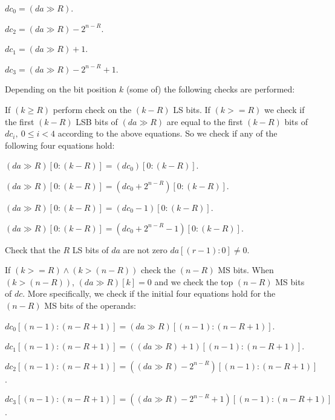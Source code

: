 \begin{DoxyItemize}
\item $dc_0 = (da \gg R)$.
\item $dc_2 = (da \gg R) - 2^{n-R}$.
\item $dc_1 = (da \gg R) + 1$.
\item $dc_3 = (da \gg R) - 2^{n-R} + 1$.
\end{DoxyItemize}

\-Depending on the bit position $k$ (some of) the following checks are performed\-:


\begin{DoxyEnumerate}
\item \-If $(k \ge R)$ perform check on the $(k-R)$ \-L\-S bits. \-If $(k >= R)$ we check if the first $(k-R)$ \-L\-S\-B bits of $(da \gg R)$ are equal to the first $(k-R)$ bits of $dc_i,~ 0 \le i < 4$ according to the above equations. \-So we check if any of the following four equations hold\-:
\begin{DoxyItemize}
\item $(da \gg R)[0:(k - R)] = (dc_0)[0:(k - R)]$.
\item $(da \gg R)[0:(k - R)] = (dc_0 + 2^{n-R})[0:(k - R)]$.
\item $(da \gg R)[0:(k - R)] = (dc_0 - 1)[0:(k - R)]$.
\item $(da \gg R)[0:(k - R)] = (dc_0 + 2^{n-R} - 1)[0:(k - R)]$.
\end{DoxyItemize}
\item \-Check that the $R$ \-L\-S bits of $da$ are not zero $da[(r-1):0] \neq 0$.
\item \-If $(k >= R) \wedge (k > (n - R))$ check the $(n-R)$ \-M\-S bits. \-When $(k > (n - R))$, $(da \gg R)[k] = 0$ and we check the top $(n-R)$ \-M\-S bits of $dc$. \-More specifically, we check if the initial four equations hold for the $(n-R)$ \-M\-S bits of the operands\-:
\begin{DoxyItemize}
\item $dc_0[(n-1):(n-R+1)] = (da \gg R)[(n-1):(n-R+1)]$.
\item $dc_1[(n-1):(n-R+1)] = ((da \gg R) + 1)[(n-1):(n-R+1)]$.
\item $dc_2[(n-1):(n-R+1)] = ((da \gg R) - 2^{n-R})[(n-1):(n-R+1)]$.
\item $dc_3[(n-1):(n-R+1)] = ((da \gg R) - 2^{n-R} + 1)[(n-1):(n-R+1)]$. 
\end{DoxyItemize}
\end{DoxyEnumerate}\hypertarget{tea-f-add-pddt_8cc_af962bfb5724a4f1dd45fdb2fdeac49f4}{
}
